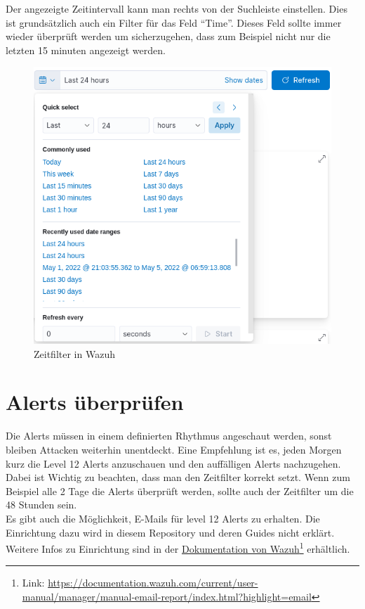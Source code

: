 Der angezeigte Zeitintervall kann man rechts von der Suchleiste einstellen.
Dies ist grundsätzlich auch ein Filter für das Feld ``Time''.
Dieses Feld sollte immer wieder überprüft werden um sicherzugehen, dass zum Beispiel nicht nur die letzten 15 minuten angezeigt werden.
\begin{figure}[H]
    \centering
    \includegraphics[width=\linewidth]{../img/zeitfilter.png}
    \caption{Zeitfilter in Wazuh}
\end{figure}

\section{Alerts überprüfen}
Die Alerts müssen in einem definierten Rhythmus angeschaut werden, sonst bleiben Attacken weiterhin unentdeckt.
Eine Empfehlung ist es, jeden Morgen kurz die Level 12 Alerts anzuschauen und den auffälligen Alerts nachzugehen.
Dabei ist Wichtig zu beachten, dass man den Zeitfilter korrekt setzt. 
Wenn zum Beispiel alle 2 Tage die Alerts überprüft werden, sollte auch der Zeitfilter um die 48 Stunden sein.\\

Es gibt auch die Möglichkeit, E-Mails für level 12 Alerts zu erhalten.
Die Einrichtung dazu wird in diesem Repository und deren Guides nicht erklärt.
Weitere Infos zu Einrichtung sind in der \href{https://documentation.wazuh.com/current/user-manual/manager/manual-email-report/index.html?highlight=email}{Dokumentation von Wazuh}\footnote{Link: \href{https://documentation.wazuh.com/current/user-manual/manager/manual-email-report/index.html?highlight=email}{https://documentation.wazuh.com/current/user-manual/manager/manual-email-report/index.html?highlight=email}} erhältlich.


